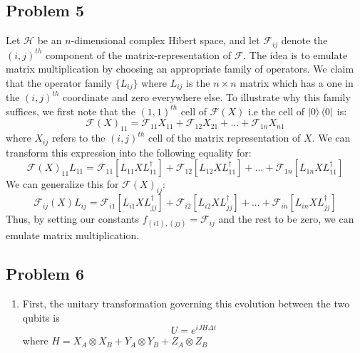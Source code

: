 \documentclass[12pt]{article}%
\begin{document}
  \subsection*{Problem 5}
  Let $\mathcal{H}$ be an $n$-dimensional complex Hibert space, and
  let $\mathcal{F}_{ij}$ denote the $(i,j)^{th}$ component of the matrix-representation of $\mathcal{F}$. The idea is to emulate matrix multiplication by choosing an appropriate family of operators.
  We claim that the operator family $\{L_{ij}\}$ where $L_{ij}$ is the $n\times n$ matrix which has a one in the $(i,j)^{th}$ coordinate and zero everywhere else. To illustrate why this family suffices, we first note that the $(1,1)^{th}$ cell of $\mathcal{F}(X)$ i.e the cell of $\ket{0}\bra{0}$ is:
  $$\mathcal{F}(X)_{11} = \mathcal{F}_{11}{X_{11}} + \mathcal{F}_{12}X_{21} + ... + \mathcal{F}_{1n}X_{n1}$$ where $X_{ij}$ refers to the $(i,j)^{th}$ cell of the matrix representation of $X$. We can transform this expression into the following equality for:
  $$\mathcal{F}(X)_{11}L_{11} = \mathcal{F}_{11}[L_{11}XL_{11}^{\dagger}] + \mathcal{F}_{12}[L_{12}XL_{11}^{\dagger}] + ... + \mathcal{F}_{1n}[L_{1n}XL_{11}^{\dagger}] $$
  We can generalize this for $\mathcal{F}(X)_{ij}$:
  $$ \mathcal{F}_{ij}(X)L_{ij} = \mathcal{F
  }_{i1}[L_{i1}XL_{jj}^{\dagger}] + \mathcal{F
  }_{i2}[L_{i2}XL_{jj}^{\dagger}] + ... +\mathcal{F
  }_{in}[L_{in}XL_{jj}^{\dagger}]$$
  Thus, by setting our constants $f_{(i1),(jj)} = \mathcal{F}_{ij}$ and the rest to be zero, we can emulate matrix multiplication.

  \subsection*{Problem 6}
  \begin{enumerate}
    \item First, the unitary transformation governing this evolution between the two qubits is
    $$ U = e^{iJH\Delta t}$$ where $H = X_A \otimes X_B + Y_A \otimes Y_B + Z_A \otimes Z_B$
  \end{enumerate}
\end{document}
